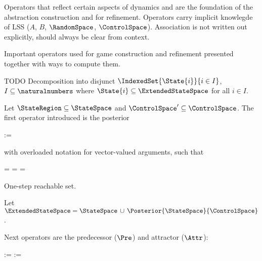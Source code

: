Operators that reflect certain aspects of dynamics and are the foundation of the abstraction construction and for refinement.
Operators carry implicit knowlegde of LSS ($A$, $B$, $\RandomSpace$, $\ControlSpace$).
Association is not written out explicitly, should always be clear from context.

Important operators used for game construction and refinement presented together with ways to compute them.

TODO Decomposition into disjunct $\IndexedSet{\State{i}}{i \in I}$, $I \subseteq \naturalnumbers$ where $\State{i} \subseteq \ExtendedStateSpace$ for all $i \in I$.


\startsubsection[title={Posterior}]

    Let $\StateRegion \subseteq \StateSpace$ and $\ControlSpace' \subseteq \ControlSpace$.
    The first operator introduced is the posterior

    \startformula
         :=  \EndComma
    \stopformula

    with overloaded notation for vector-valued arguments, such that

    \startformula
        \startalign[n=2,align={right,left}]
            \NC {} = \NC {} \EndComma \NR
            \NC {} = \NC {} \EndAnd \NR
            \NC {} = \NC {} \EndPeriod \NR
        \stopalign
    \stopformula

    One-step reachable set.

    Let $\ExtendedStateSpace = \StateSpace \,\cup\, \Posterior{\StateSpace}{\ControlSpace}$.

\stopsection


\startsubsection[title={Predecessors}]

    Next operators are the predecessor ($\Pre$) and attractor ($\Attr$):

    \startformula
        \startalign[n=2,align={right,left}]
            \NC {} :=
            \NC {} \EndComma
            \NR
            \NC {} :=
            \NC {} \EndComma
            \NR
        \stopalign
    \stopformula

